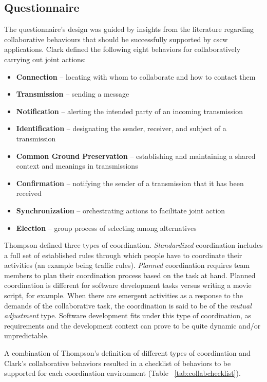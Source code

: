 \documentclass[conference]{IEEEtran}
\begin{document}
\subsection{Questionnaire}
The questionnaire's design was guided by insights from the literature regarding collaborative behaviours that should be successfully supported by {\sc cscw} applications. Clark \cite{Clark96} defined the following eight behaviors for collaboratively carrying out joint actions:

\begin{itemize}
\item \textbf{Connection} -- locating with whom to collaborate and how to contact them
\item \textbf{Transmission} -- sending a message
\item \textbf{Notification} -- alerting the intended party of an incoming transmission
\item \textbf{Identification} -- designating the sender, receiver, and subject of a transmission
\item \textbf{Common Ground Preservation} -- establishing and maintaining a shared context and meanings in transmissions
\item \textbf{Confirmation} -- notifying the sender of a transmission that it has been received
\item \textbf{Synchronization} -- orchestrating actions to facilitate joint action
\item \textbf{Election} -- group process of selecting among alternatives
\end{itemize}

Thompson \cite{Thompson67} defined three types of coordination. \textit{Standardized} coordination includes a full set of established rules through which people have to coordinate their activities (an example being traffic rules). \textit{Planned} coordination requires team members to plan their coordination process based on the task at hand. Planned coordination is different for software development tasks versus writing a movie script, for example. When there are emergent activities as a response to the demands of the collaborative task, the coordination is said to be of the \textit{mutual adjustment} type. Software development fits under this type of coordination, as requirements and the development context can prove to be quite dynamic and/or unpredictable.

A combination of Thompson's \cite{Thompson67} definition of different types of coordination and Clark's \cite{Clark96} collaborative behaviors resulted in a checklist of behaviors to be supported for each coordination environment (Table ~\ref{tab:collabchecklist}).
\end{document}
